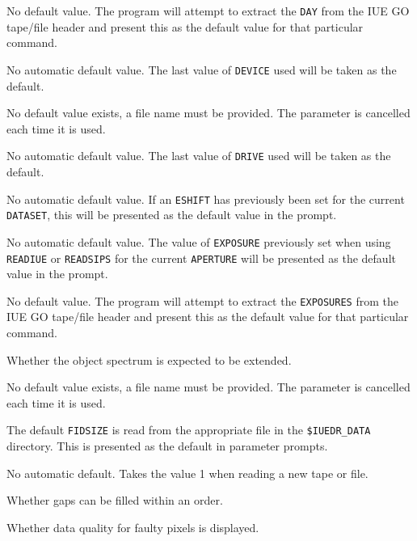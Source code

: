 \begin {description}
   No default value.  The program will attempt to extract the \verb+DAY+ from
   the IUE GO tape/file header and present this as the default value for that
   particular command.
\item [\htmlref{DEVICE}{DEVICE}] \lmbox
   No automatic default value.  The last value of \verb+DEVICE+ used will be
   taken as the default.
\item [\htmlref{DISPFILE}{DISPFILE}] \lmbox
   No default value exists, a file name must be provided.
   The parameter is cancelled each time it is used.
\item [\htmlref{DRIVE}{DRIVE}] \lmbox
   No automatic default value.  The last value of \verb+DRIVE+ used will be
   taken as the default.
\item [\htmlref{ESHIFT}{ESHIFT}] \lmbox
   No automatic default value.  If an \verb+ESHIFT+ has previously been set for
   the current \verb+DATASET+, this will be presented as the default value in
   the prompt.
\item [\htmlref{EXPOSURE}{EXPOSURE}] \lmbox
   No automatic default value.  The value of \verb+EXPOSURE+ previously set when
   using \verb+READIUE+ or \verb+READSIPS+ for the current \verb+APERTURE+ will
   be presented as the default value in the prompt.
\item [\htmlref{EXPOSURES}{EXPOSURES}] \lmbox
   No default value.  The program will attempt to extract the \verb+EXPOSURES+
   from the IUE GO tape/file header and present this as the default value for
   that particular command.
\item [\htmlref{EXTENDED}{EXTENDED} = FALSE] \lmbox
   Whether the object spectrum is expected to be extended.
\item [\htmlref{FIDFILE}{FIDFILE}] \lmbox
   No default value exists, a file name must be provided.
   The parameter is cancelled each time it is used.
\item [\htmlref{FIDSIZE}{FIDSIZE}] \lmbox
   The default \verb+FIDSIZE+ is read from the appropriate file in the
   \verb+$IUEDR_DATA+ directory.  This is presented as the default in parameter
   prompts.
\item [\htmlref{FILE}{FILE}] \lmbox
   No automatic default.  Takes the value 1 when reading a new tape or file.
\item [\htmlref{FILLGAP}{FILLGAP} = FALSE] \lmbox
   Whether gaps can be filled within an order.
\item [\htmlref{FLAG}{FLAG} = TRUE] \lmbox
   Whether data quality for faulty pixels is displayed.
\item [\htmlref{FN}{FN}] \lmbox

\end{description}
